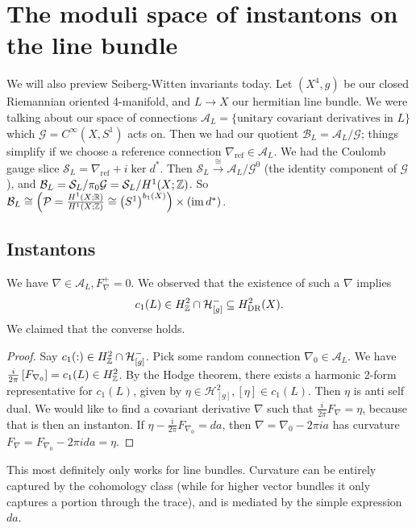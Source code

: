 \section{The moduli space of instantons on the line bundle} 
We will also preview Seiberg-Witten invariants today. Let $(X^4,g)$ be our closed Riemannian oriented 4-manifold, and $L \to X$ our hermitian line bundle. We were talking about our space of connections $\mathcal A_L = \{\text{unitary covariant derivatives in }  L\} $ which $\mathcal G = C ^{\infty}(X, S^1 )$ acts on. Then we had our quotient $\mathcal B_L = \mathcal A_L / \mathcal G$; things simplify if we choose a reference connection $\nabla _{\mathrm{ref}} \in \mathcal A_L$. We had the Coulomb gauge slice $\mathcal S _L = \nabla _{\mathrm{ref}}+ i\ker d^*$. Then $\mathcal S_L \xrightarrow{\cong} \mathcal A_L / \mathcal G^0$ (the identity component of $\mathcal G$), and $\mathcal B_L = \mathcal S_L / \pi_0 \mathcal G = \mathcal S_L / H^1(X;\mathbb{Z})$. So 
$\mathcal B_L \cong  \left( \mathcal P = \frac{H^1(X;\mathbb{R})}{H^1(X;\mathbb{Z})}\cong  \left( S^1  \right) ^{b_1(X)} \right) \times \left( \operatorname{im} d^* \right) $. 

\subsection{Instantons}
We have $\nabla \in \mathcal A_L, F_{\nabla}^+ = 0$. We observed that the existence of such a $\nabla$ implies \[
    c_1(L ) \in  H^2 _{\mathbb{Z} }\cap  \mathcal H _{[g]}^- \subseteq H^2 _{\mathrm{DR}}(X).
\] We claimed that the converse holds.
\begin{proof}
    Say  $c_1(:) \in H^2 _{\mathbb{Z}}\cap  \mathcal H^- _{[g]}$. Pick some random connection $\nabla_0 \in \mathcal A_L$. We have $ \frac{i}{2\pi}\left[ F_{\nabla_0} \right] = c_1(L) \in H^2_{\mathbb{Z}}$. By the Hodge theorem, there exists a  harmonic 2-form representative for $c_1(L)$, given by $\eta \in \mathcal H^2_{[g]}, [\eta] \in c_1(L)$. Then $\eta$ is anti self dual. We would like to find a covariant derivative $\nabla$ such that $\frac{i}{2\pi}F_{\nabla}=\eta$, because that is then an instanton. If $\eta - \frac{i}{2\pi}F _{\nabla_0}=d a$, then $\nabla = \nabla_0-2\pi i a$ has curvature $F _{\nabla}= F_{\nabla_0}-2\pi i da = \eta$. 
\end{proof}
This most definitely only works for line bundles. Curvature can be entirely captured by the cohomology class (while for higher vector bundles it only captures a portion through the trace), and is mediated by the simple expression $da$.

